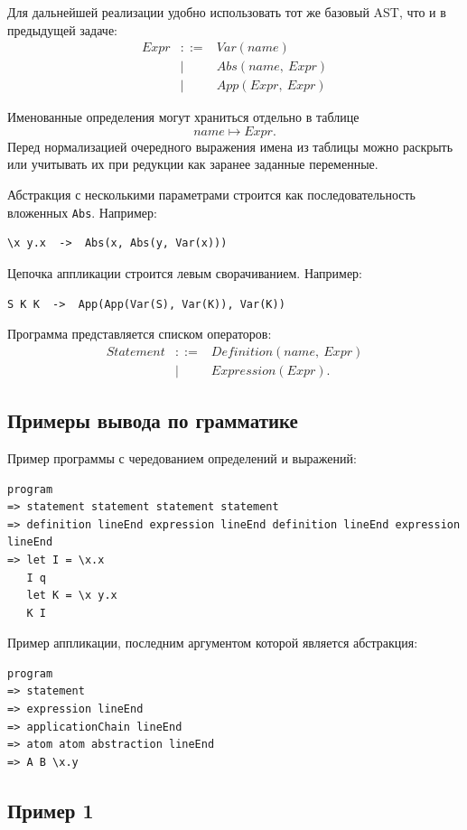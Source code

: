 \documentclass[12pt,a4paper]{article}
\begin{document}
Для дальнейшей реализации удобно использовать тот же базовый AST, что и в
предыдущей задаче:
\[
\begin{array}{rcl}
Expr & ::= & Var(name) \\
     & \mid & Abs(name,\ Expr) \\
     & \mid & App(Expr,\ Expr)
\end{array}
\]

Именованные определения могут храниться отдельно в таблице
\[
name \mapsto Expr.
\]
Перед нормализацией очередного выражения имена из таблицы можно раскрыть
или учитывать их при редукции как заранее заданные переменные.

Абстракция с несколькими параметрами строится как последовательность
вложенных \verb|Abs|. Например:
\begin{verbatim}
\x y.x  ->  Abs(x, Abs(y, Var(x)))
\end{verbatim}

Цепочка аппликации строится левым сворачиванием. Например:
\begin{verbatim}
S K K  ->  App(App(Var(S), Var(K)), Var(K))
\end{verbatim}

Программа представляется списком операторов:
\[
\begin{array}{rcl}
Statement & ::= & Definition(name,\ Expr) \\
          & \mid & Expression(Expr).
\end{array}
\]

\subsection*{Примеры вывода по грамматике}

Пример программы с чередованием определений и выражений:
\begin{verbatim}
program
=> statement statement statement statement
=> definition lineEnd expression lineEnd definition lineEnd expression lineEnd
=> let I = \x.x
   I q
   let K = \x y.x
   K I
\end{verbatim}

Пример аппликации, последним аргументом которой является абстракция:
\begin{verbatim}
program
=> statement
=> expression lineEnd
=> applicationChain lineEnd
=> atom atom abstraction lineEnd
=> A B \x.y
\end{verbatim}

\subsection*{Пример 1}
\end{document}
